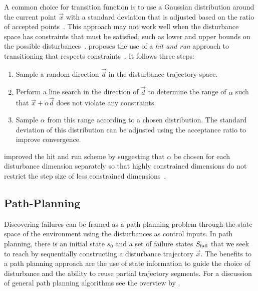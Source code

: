 A common choice for transition function is to use a Gaussian distribution around the current point $\vec{x}$ with a standard deviation that is adjusted based on the ratio of accepted points~\cite{kochenderfer2019algorithms}. This approach may not work well when the disturbance space has constraints that must be satisfied, such as lower and upper bounds on the possible disturbances~\cite{abbas2013probabilistic}. \textcite{abbas2013probabilistic} proposes the use of a \emph{hit and run} approach to transitioning that respects constraints~\cite{abbas2013probabilistic}. It follows three steps:
\begin{enumerate}
    \item Sample a random direction $\vec{d}$ in the disturbance trajectory space.
    \item Perform a line search in the direction of $\vec{d}$ to determine the range of $\alpha$ such that $\vec{x} + \alpha \vec{d}$ does not violate any constraints.
    \item Sample $\alpha$ from this range according to a chosen distribution. The standard deviation of this distribution can be adjusted using the acceptance ratio to improve convergence. 
\end{enumerate}
\textcite{aerts2018temporal} improved the hit and run scheme by suggesting that $\alpha$ be chosen for each disturbance dimension separately so that highly constrained dimensions do not restrict the step size of less constrained dimensions~\cite{aerts2018temporal}.

\subsection{Path-Planning}
Discovering failures can be framed as a path planning problem through the state space of the environment using the disturbances as control inputs. In path planning, there is an initial state $s_0$ and a set of failure states $S_{\rm fail}$ that we seek to reach by sequentially constructing a disturbance trajectory $\vec{x}$. The benefits to a path planning approach are the use of state information to guide the choice of disturbance and the ability to reuse partial trajectory segments. For a discussion of general path planning algorithms see the overview by \textcite{lavalle2006planning}.

